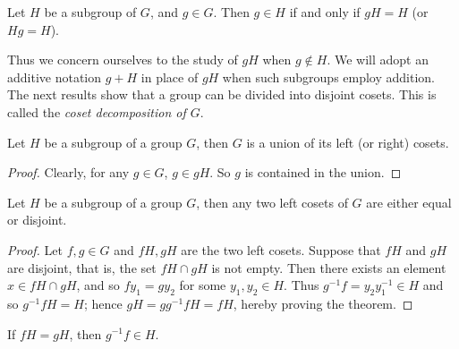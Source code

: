 \documentclass[main.tex]{subfiles}
\begin{document}
				\begin{theorem}
					Let $H$ be a subgroup of $G$, and $g \in G$. Then $g \in H$ if and only if $gH = H$ (or $Hg = H$).
				\end{theorem}
				
				Thus we concern ourselves to the study of $gH$ when $g \notin H$. We will adopt an additive notation $g + H$ in place of $gH$ when such subgroups employ addition. The next results show that a group can be divided into disjoint cosets. This is called the \textit{coset decomposition of $G$}.
				
				\begin{theorem}
					Let $H$ be a subgroup of a group $G$, then $G$ is a union of its left (or right) cosets.
				\end{theorem}
				\begin{proof}
					Clearly, for any $g \in G$, $g \in gH$. So $g$ is contained in the union.
				\end{proof}
			
				\begin{theorem}
					Let $H$ be a subgroup of a group $G$, then any two left cosets of $G$ are either equal or disjoint.
				\end{theorem}
				\begin{proof}
					Let $f, g \in G$ and $fH, gH$ are the two left cosets. Suppose that $fH$ and $gH$ are disjoint, that is, the set $fH \cap gH$ is not empty. Then there exists an element $x \in fH \cap gH$, and so $fy_1 = gy_2$ for some $y_1, y_2 \in H$. Thus $g^{-1}f = y_2y^{-1}_1 \in H$ and so $g^{-1}fH = H$; hence $gH = g g^{-1} f H = fH$, hereby proving the theorem.
				\end{proof}
				\begin{corollary}
					If $fH = gH$, then $g^{-1} f \in H$.
				\end{corollary}
				
\end{document}
